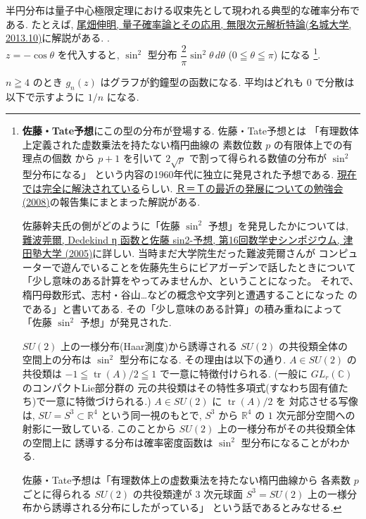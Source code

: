 \documentclass[12pt,twoside]{jarticle}
\newcommand\R{{\mathbb R}} %
\newcommand\C{{\mathbb C}} %
\theoremstyle{jplain}
\theoremstyle{jplain}
\theoremstyle{jplain}
\numberwithin{theorem}{section}
\numberwithin{equation}{section}
\numberwithin{figure}{section}
\numberwithin{table}{section}
\begin{document}
\begin{itemize}
{半円分布は量子中心極限定理における収束先として現われる典型的な確率分布である.
たとえば,
\href{http://www.math.is.tohoku.ac.jp/~obata/student/graduate/file/2013-Meijo-QP-Graph.pdf}
{尾畑伸明, 量子確率論とその応用, 無限次元解析特論(名城大学, 2013.10)}に解説がある.
}.
\\
$z=-\cos\theta$ を代入すると, $\sin^2$ 型分布
$\dfrac{2}{\pi}\sin^2\theta\,d\theta$ ($0\leqq\theta\leqq\pi$) になる%
\footnote{\label{fn:Sato-Tate}%
{\bfseries 佐藤・Tate予想}にこの型の分布が登場する.
佐藤・Tate予想とは
「有理数体上定義された虚数乗法を持たない楕円曲線の
素数位数 $p$ の有限体上での有理点の個数
から $p+1$ を引いて $2\sqrt{p}$ で割って得られる数値の分布が $\sin^2$ 型分布になる」
という内容の1960年代に独立に発見された予想である.
\href{http://www.math.ias.edu/~rtaylor/}{現在では完全に解決されている}らしい.
\href{http://www.kurims.kyoto-u.ac.jp/~gokun/R=T.html}
{Ｒ＝Ｔの最近の発展についての勉強会(2008)}の報告集にまとまった解説がある.

佐藤幹夫氏の側がどのように「佐藤 $\sin^2$ 予想」を発見したかについては,
\href{http://www2.tsuda.ac.jp/suukeiken/math/suugakushi/sympo16/16_8nanba.pdf}
{難波莞爾, Dedekind η 函数と佐藤 sin2-予想, 第16回数学史シンポジウム,
津田塾大学 (2005)}に詳しい. 当時まだ大学院生だった難波莞爾さんが
コンピューターで遊んでいることを佐藤先生らにビアガーデンで話したときについて
「少し意味のある計算をやってみませんか、ということになった。
それで、楕円母数形式、志村・谷山…などの概念や文字列と遭遇することになった
のである」と書いてある. その「少し意味のある計算」の積み重ねによって
「佐藤 $\sin^2$ 予想」が発見された.

$SU(2)$ 上の一様分布(Haar測度)から誘導される $SU(2)$ の共役類全体の
空間上の分布は $\sin^2$ 型分布になる. その理由は以下の通り.
$A\in SU(2)$ の共役類は $-1\leqq\operatorname{tr}(A)/2\leqq 1$
で一意に特徴付けられる. (一般に $GL_r(\C)$ のコンパクトLie部分群の
元の共役類はその特性多項式(すなわち固有値たち)で一意に特徴づけられる.)
$A\in SU(2)$ に $\operatorname{tr}(A)/2$ を
対応させる写像は, $SU=S^3\subset\R^4$ という同一視のもとで,
$S^3$ から $\R^4$ の $1$ 次元部分空間への射影に一致している.
このことから $SU(2)$ 上の一様分布がその共役類全体の空間上に
誘導する分布は確率密度函数は $\sin^2$ 型分布になることがわかる.

佐藤・Tate予想は「有理数体上の虚数乗法を持たない楕円曲線から
各素数 $p$ ごとに得られる $SU(2)$ の共役類達が
$3$ 次元球面 $S^3=SU(2)$ 上の一様分布から誘導される分布にしたがっている」
という話であるとみなせる.
}.

\end{itemize}
$n\geqq 4$ のとき $g_n(z)$ はグラフが釣鐘型の函数になる.
平均はどれも $0$ で分散は以下で示すように $1/n$ になる.
\end{document}
